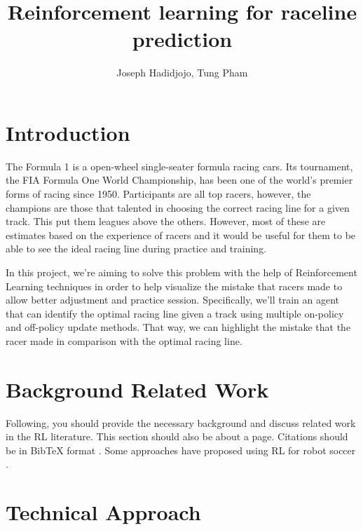 \documentclass{article}
\title{Reinforcement learning for raceline prediction}
\author{Joseph Hadidjojo, Tung Pham}
\date{\vspace{-1em}}
\begin{document}
\maketitle


\section{Introduction}

The Formula 1 is a open-wheel single-seater formula racing cars. Its tournament,
the FIA Formula One World Championship, has been one of the world's premier forms of racing since 1950.
Participants are all top racers, however, the champions are those that talented
in choosing the correct racing line for a given track. This put them
leagues above the others. However, most of these are estimates based on the
experience of racers and it would be useful for them to be able to see the ideal
racing line during practice and training.

In this project, we're aiming to solve this problem with the help of
Reinforcement Learning techniques in order to help visualize the mistake that
racers made to allow better adjustment and practice session. Specifically, we'll
train an agent that can identify the optimal racing line given a track using
multiple on-policy and off-policy update methods. That way, we can highlight the
mistake that the racer made in comparison with the optimal racing line.

\section{Background Related Work}

Following, you should provide the necessary background and discuss related work in the RL literature. This section should also be about a page. Citations should be in BibTeX format \citep{thrun2005probabilistic}. Some approaches have proposed using RL for robot soccer \cite{riedmiller2009reinforcement}.

\section{Technical Approach}
\end{document}
